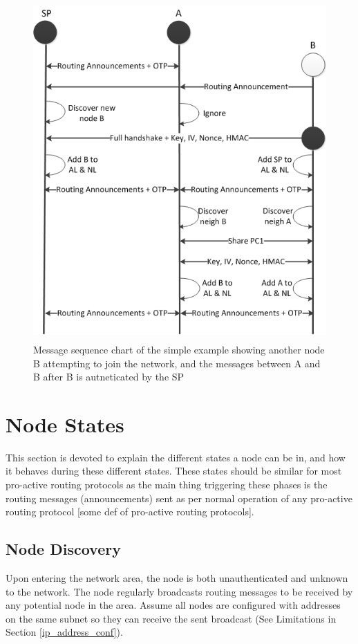 \begin{figure}[h]
	\centering
  	\includegraphics[height=13cm]{images/simple_example_msc_2.png}
  	\caption{Message sequence chart of the simple example showing another node B
  	  attempting to join the network, and the messages between A and B after B
  	  is autneticated by the SP}
	\label{fig:simple_example_msc_2}
\end{figure}


\section{Node States}
This section is devoted to explain the different states a node can be in, and
how it behaves during these different states. These states should be similar for
most pro-active routing protocols as the main thing triggering these phases
is the routing messages (announcements) sent as per normal operation of any
pro-active routing protocol [some def of pro-active routing protocols].

\subsection{Node Discovery}
Upon entering the network area, the node is both unauthenticated and unknown to
the network. The node regularly broadcasts routing messages to be received by
any potential node in the area. Assume all nodes are configured with addresses
on the same subnet so they can receive the sent broadcast (See Limitations in
Section \ref{ip_address_conf}).

